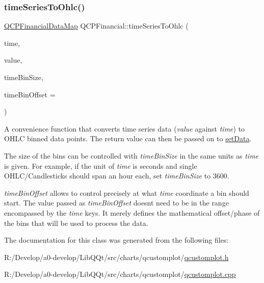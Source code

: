 \subsubsection{\texorpdfstring{time\+Series\+To\+Ohlc()}{timeSeriesToOhlc()}}
{\footnotesize\ttfamily \mbox{\hyperlink{qcustomplot_8h_a745c09823fae0974b50beca9bc3b3d7d}{Q\+C\+P\+Financial\+Data\+Map}} Q\+C\+P\+Financial\+::time\+Series\+To\+Ohlc (\begin{DoxyParamCaption}\item[{const Q\+Vector$<$ double $>$ \&}]{time,  }\item[{const Q\+Vector$<$ double $>$ \&}]{value,  }\item[{double}]{time\+Bin\+Size,  }\item[{double}]{time\+Bin\+Offset = {} }\end{DoxyParamCaption})\hspace{0.3cm}{\ttfamily [static]}}

A convenience function that converts time series data ({\itshape value} against {\itshape time}) to O\+H\+LC binned data points. The return value can then be passed on to \mbox{\hyperlink{class_q_c_p_financial_adf12a86082f1e488df6a4e8603f8fd6d}{set\+Data}}.

The size of the bins can be controlled with {\itshape time\+Bin\+Size} in the same units as {\itshape time} is given. For example, if the unit of {\itshape time} is seconds and single O\+H\+L\+C/\+Candlesticks should span an hour each, set {\itshape time\+Bin\+Size} to 3600.

{\itshape time\+Bin\+Offset} allows to control precisely at what {\itshape time} coordinate a bin should start. The value passed as {\itshape time\+Bin\+Offset} doesn\textquotesingle{}t need to be in the range encompassed by the {\itshape time} keys. It merely defines the mathematical offset/phase of the bins that will be used to process the data. 

The documentation for this class was generated from the following files\+:\begin{DoxyCompactItemize}
\item 
R\+:/\+Develop/a0-\/develop/\+Lib\+Q\+Qt/src/charts/qcustomplot/\mbox{\hyperlink{qcustomplot_8h}{qcustomplot.\+h}}\item 
R\+:/\+Develop/a0-\/develop/\+Lib\+Q\+Qt/src/charts/qcustomplot/\mbox{\hyperlink{qcustomplot_8cpp}{qcustomplot.\+cpp}}\end{DoxyCompactItemize}
